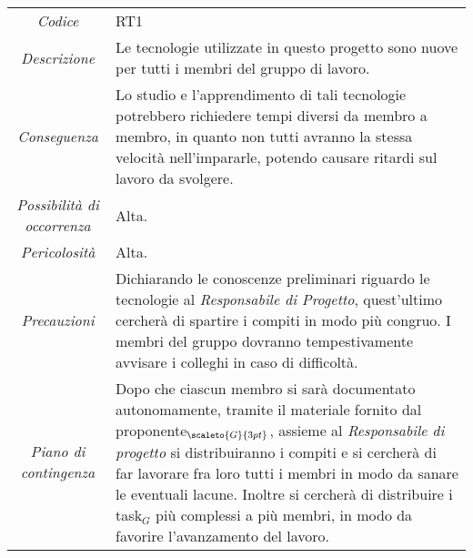 \def\tabularxcolumn#1{m{#1}}
{
	
	\begin{center}
		\renewcommand{\arraystretch}{1.4}
		\begin{tabularx}{\textwidth}{|c|X|}
			\hline
			\rowcolor{airforceblue}
			\multicolumn{2}{|c|}{\textit{Inesperienza tecnologica}}\\
			\hline
			\textit{Codice} & RT1 \\
			\hline
			\textit{Descrizione} & Le tecnologie utilizzate in questo progetto sono nuove per tutti i membri del gruppo di lavoro. \\
			\hline
			\textit{Conseguenza} & Lo studio e l'apprendimento di tali tecnologie potrebbero richiedere tempi diversi da membro a membro, in quanto non tutti avranno la stessa velocità nell'impararle, potendo causare ritardi sul lavoro da svolgere. \\
			\hline
			\textit{Possibilità di occorrenza} & Alta. \\
			\hline
			\textit{Pericolosità} & Alta. \\
			\hline
			\textit{Precauzioni} & Dichiarando le conoscenze preliminari riguardo le tecnologie al \textit{Responsabile di Progetto}, quest'ultimo cercherà di spartire i compiti in modo più congruo.
			I membri del gruppo dovranno tempestivamente avvisare i colleghi in caso di difficoltà.  \\
			\hline
			\textit{Piano di contingenza} & Dopo che ciascun membro si sarà documentato autonomamente, tramite il materiale fornito dal proponente$_{\scaleto{G}{3pt}}$, assieme al \textit{Responsabile di progetto} si distribuiranno i compiti e si cercherà di far lavorare fra loro tutti i membri in modo da sanare le eventuali lacune.
			Inoltre si cercherà di distribuire i task$_G$ più complessi a più membri, in modo da favorire l'avanzamento del lavoro.  \\
			\hline
		\end{tabularx}
	\end{center}


\def\tabularxcolumn#1{m{#1}}
{
	
}}
